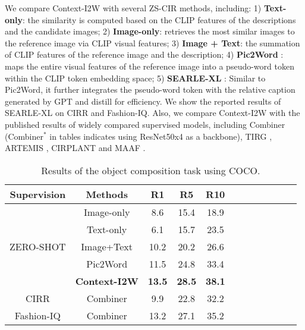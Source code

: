 \documentclass[letterpaper]{article} \usepackage{aaai24}  \usepackage{times}  \usepackage{helvet}  \usepackage{courier}  \usepackage[hyphens]{url}  \usepackage{graphicx} \urlstyle{rm} \def\UrlFont{\rm}  \usepackage{natbib}  \usepackage{caption} \frenchspacing  \setlength{\pdfpagewidth}{8.5in} \setlength{\pdfpageheight}{11in} \usepackage{algorithm}
\begin{document}
We compare Context-I2W with several ZS-CIR methods, including: 1) \textbf{Text-only}: the similarity is computed based on the CLIP features of the descriptions and the candidate images; 2) \textbf{Image-only}: retrieves the most similar images to the reference image via CLIP visual features; 3) \textbf{Image + Text}: the summation of CLIP features of the reference image and the description; 4)  \textbf{Pic2Word} \cite{Saito_2023_CVPR}: maps the entire visual features of the reference image into a pseudo-word token within the CLIP token embedding space; 5) \textbf{SEARLE-XL} \cite{baldrati2023zero}: Similar to Pic2Word, it further integrates the pseudo-word token with the relative caption generated by GPT \cite{brown2020language} and distill for efficiency.  
We show the reported results of SEARLE-XL on CIRR and Fashion-IQ. Also, we compare Context-I2W with the published results of widely compared supervised models, including Combiner \cite{Baldrati_2022_CVPR} (Combiner$^*$  in tables indicates using ResNet50x4 as a backbone), TIRG \cite{vo2019composing}, ARTEMIS \cite{delmas2022artemis}, CIRPLANT\cite{Liu_2021_ICCV} and MAAF \cite{dodds2020modality}.


\begin{table}[t]
\centering
\scalebox{1.1}
{\scriptsize
\begin{tabular}{cccccccccccc}
\toprule
Supervision                                     & Methods                           & R1            & R5            & \multicolumn{1}{l}{R10} \\  \midrule
\multicolumn{1}{c|}{\multirow{5}{*}{ZERO-SHOT}} & \multicolumn{1}{c|}{Image-only}   & 8.6           & 15.4          & 18.9                    \\
\multicolumn{1}{c|}{}                           & \multicolumn{1}{c|}{Text-only}    & 6.1           & 15.7          & 23.5                    \\
\multicolumn{1}{c|}{}                           & \multicolumn{1}{c|}{Image+Text}   & 10.2          & 20.2          & 26.6                    \\
\multicolumn{1}{c|}{}                           & \multicolumn{1}{c|}{Pic2Word}     & 11.5          & 24.8          & 33.4                    \\
\multicolumn{1}{c|}{}                           & \multicolumn{1}{c|}{\textbf{Context-I2W}} & \textbf{13.5}          & \textbf{28.5}          & \textbf{38.1}           \\ \cmidrule(lr){1-5}
\multicolumn{1}{c|}{CIRR}                       & \multicolumn{1}{c|}{Combiner}     & 9.9           & 22.8          & 32.2                    \\
\multicolumn{1}{c|}{Fashion-IQ}                 & \multicolumn{1}{c|}{Combiner}     & 13.2          & 27.1          & 35.2                   \\ \bottomrule
\end{tabular}}
\caption{Results of the object composition task using COCO.}
\label{tab:coco}
\end{table}
\end{document}

